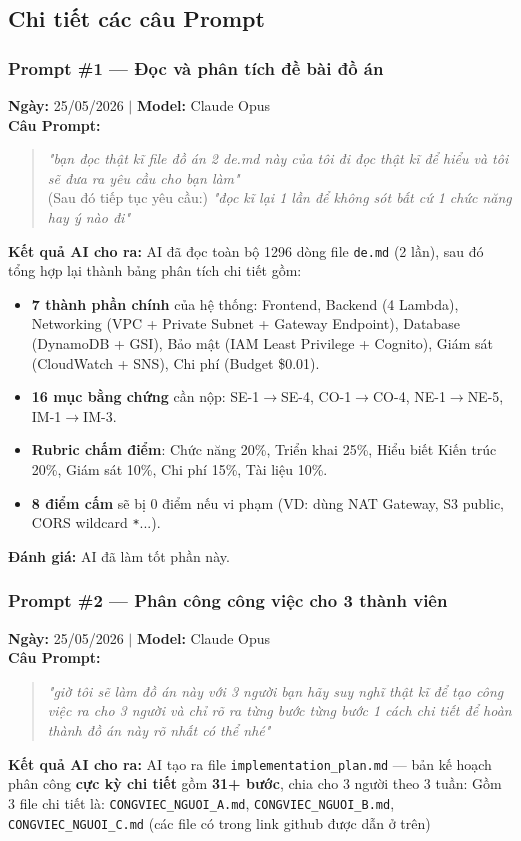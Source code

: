 \documentclass[13pt]{article}
\begin{document}
\subsection{Chi tiết các câu Prompt}

\subsubsection{Prompt \#1 — Đọc và phân tích đề bài đồ án}
\textbf{Ngày:} 25/05/2026 $|$ \textbf{Model:} Claude Opus\\
\textbf{Câu Prompt:}
\begin{quote}
\textit{"bạn đọc thật kĩ file đồ án 2 de.md này của tôi đi đọc thật kĩ để hiểu và tôi sẽ đưa ra yêu cầu cho bạn làm"}\\
(Sau đó tiếp tục yêu cầu:) \textit{"đọc kĩ lại 1 lần để không sót bất cứ 1 chức năng hay ý nào đi"}
\end{quote}
\textbf{Kết quả AI cho ra:}
AI đã đọc toàn bộ 1296 dòng file \texttt{de.md} (2 lần), sau đó tổng hợp lại thành bảng phân tích chi tiết gồm:
\begin{itemize}
    \item \textbf{7 thành phần chính} của hệ thống: Frontend, Backend (4 Lambda), Networking (VPC + Private Subnet + Gateway Endpoint), Database (DynamoDB + GSI), Bảo mật (IAM Least Privilege + Cognito), Giám sát (CloudWatch + SNS), Chi phí (Budget \$0.01).
    \item \textbf{16 mục bằng chứng} cần nộp: SE-1$\rightarrow$SE-4, CO-1$\rightarrow$CO-4, NE-1$\rightarrow$NE-5, IM-1$\rightarrow$IM-3.
    \item \textbf{Rubric chấm điểm}: Chức năng 20\%, Triển khai 25\%, Hiểu biết Kiến trúc 20\%, Giám sát 10\%, Chi phí 15\%, Tài liệu 10\%.
    \item \textbf{8 điểm cấm} sẽ bị 0 điểm nếu vi phạm (VD: dùng NAT Gateway, S3 public, CORS wildcard \texttt{*}...).
\end{itemize}
\textbf{Đánh giá:} AI đã làm tốt phần này.

\subsubsection{Prompt \#2 — Phân công công việc cho 3 thành viên}
\textbf{Ngày:} 25/05/2026 $|$ \textbf{Model:} Claude Opus\\
\textbf{Câu Prompt:}
\begin{quote}
\textit{"giờ tôi sẽ làm đồ án này với 3 người bạn hãy suy nghĩ thật kĩ để tạo công việc ra cho 3 người và chỉ rõ ra từng bước từng bước 1 cách chi tiết để hoàn thành đồ án này rõ nhất có thể nhé"}
\end{quote}
\textbf{Kết quả AI cho ra:}
AI tạo ra file \texttt{implementation\_plan.md} — bản kế hoạch phân công \textbf{cực kỳ chi tiết} gồm \textbf{31+ bước}, chia cho 3 người theo 3 tuần:
Gồm 3 file chi tiết là:
\texttt{CONGVIEC\_NGUOI\_A.md}, \texttt{CONGVIEC\_NGUOI\_B.md}, \texttt{CONGVIEC\_NGUOI\_C.md} (các file có trong link github được dẫn ở trên)
\end{document}

